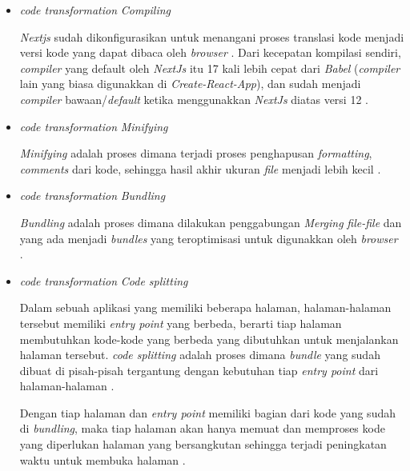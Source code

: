 \documentclass[a4paper]{article}
\begin{document}
\begin{enumerate}[label=\alph*. ]
\begin{enumerate}
\begin{itemize}
                        \item \textit{code transformation} \textit{Compiling}

                        \textit{Nextjs} sudah dikonfigurasikan untuk menangani proses translasi kode menjadi versi kode yang dapat dibaca oleh \textit{browser} \autocite{Nextjs_compiling}. Dari kecepatan kompilasi sendiri, \textit{compiler} yang default oleh \textit{NextJs} itu 17 kali lebih cepat dari \textit{Babel} (\textit{compiler} lain yang biasa digunakkan di \textit{Create-React-App}), dan sudah menjadi \textit{compiler} bawaan/\textit{default} ketika menggunakkan \textit{NextJs} diatas versi 12 \autocite{Nextjs_depth_compiler}.

                        \item \textit{code transformation} \textit{Minifying}

                        \textit{Minifying} adalah proses dimana terjadi proses penghapusan \textit{formatting}, \textit{comments} dari kode, sehingga hasil akhir ukuran \textit{file} menjadi lebih kecil \autocite{Nextjs_minifiying}.

                        \item \textit{code transformation} \textit{Bundling}

                        \textit{Bundling} adalah proses dimana dilakukan penggabungan \textit{Merging} \textit{file-file} dan yang ada menjadi \textit{bundles} yang teroptimisasi untuk digunakkan oleh \textit{browser} \autocite{Nextjs_bundling}.

                        \item \textit{code transformation} \textit{Code splitting}

                        Dalam sebuah aplikasi yang memiliki beberapa halaman, halaman-halaman tersebut memiliki \textit{entry point} yang berbeda, berarti tiap halaman membutuhkan kode-kode yang berbeda yang dibutuhkan untuk menjalankan halaman tersebut. \textit{code splitting} adalah proses dimana \textit{bundle} yang sudah dibuat di pisah-pisah tergantung dengan kebutuhan tiap \textit{entry point} dari halaman-halaman \autocite{Nextjs_code_splitting}.

                        Dengan tiap halaman dan \textit{entry point} memiliki bagian dari kode yang sudah di \textit{bundling}, maka tiap halaman akan hanya memuat dan memproses kode yang diperlukan halaman yang bersangkutan sehingga terjadi peningkatan waktu untuk membuka halaman \autocite{Nextjs_code_splitting}.


\end{itemize}
\end{enumerate}
\end{enumerate}
\end{document}
